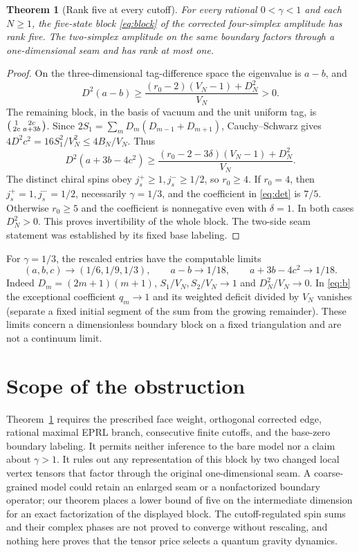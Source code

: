 \documentclass[11pt]{article}
\newtheorem{theorem}{Theorem}[section]
\theoremstyle{remark}
\begin{document}
\begin{theorem}[Rank five at every cutoff]\label{thm:rank}
For every rational \(0<\gamma<1\) and each \(N\ge1\), the five-state block \eqref{eq:block} of the corrected four-simplex amplitude has rank five. The two-simplex amplitude on the same boundary factors through a one-dimensional seam and has rank at most one.
\end{theorem}
\begin{proof}
On the three-dimensional tag-difference space the eigenvalue is \(a-b\), and
\[
 D^2(a-b)\ge
 \frac{(r_0-2)(V_N-1)+D_N^2}{V_N}>0.
\]
The remaining block, in the basis of vacuum and the unit uniform tag, is
\(\begin{psmallmatrix}1&2c\\2c&a+3b\end{psmallmatrix}\). Since
\(2S_1=\sum_mD_m(D_{m-1}+D_{m+1})\), Cauchy--Schwarz gives
\(4D^2c^2=16S_1^2/V_N^2\le4B_N/V_N\). Thus
\begin{equation}\label{eq:det}
 D^2(a+3b-4c^2)\ge
 \frac{(r_0-2-3\delta)(V_N-1)+D_N^2}{V_N}.
\end{equation}
The distinct chiral spins obey \(j_s^+\ge1,j_s^-\ge1/2\), so \(r_0\ge4\). If \(r_0=4\), then \(j_s^+=1,j_s^-=1/2\), necessarily \(\gamma=1/3\), and the coefficient in \eqref{eq:det} is \(7/5\). Otherwise \(r_0\ge5\) and the coefficient is nonnegative even with \(\delta=1\). In both cases \(D_N^2>0\). This proves invertibility of the whole block. The two-side seam statement was established by its fixed base labeling.
\end{proof}

For \(\gamma=1/3\), the rescaled entries have the computable limits
\[
 (a,b,c)\longrightarrow (1/6,1/9,1/3),\qquad
 a-b\longrightarrow1/18,\qquad a+3b-4c^2\longrightarrow1/18.
\]
Indeed \(D_m=(2m+1)(m+1)\), \(S_1/V_N,S_2/V_N\to1\) and \(D_N^2/V_N\to0\). In \eqref{eq:b} the exceptional coefficient \(q_m\to1\) and its weighted deficit divided by \(V_N\) vanishes (separate a fixed initial segment of the sum from the growing remainder). These limits concern a dimensionless boundary block on a fixed triangulation and are not a continuum limit.

\section{Scope of the obstruction}

Theorem~\ref{thm:rank} requires the prescribed face weight, orthogonal corrected edge, rational maximal EPRL branch, consecutive finite cutoffs, and the base-zero boundary labeling. It permits neither inference to the bare model nor a claim about \(\gamma>1\). It rules out any representation of this block by two changed local vertex tensors that factor through the original one-dimensional seam. A coarse-grained model could retain an enlarged seam or a nonfactorized boundary operator; our theorem places a lower bound of five on the intermediate dimension for an exact factorization of the displayed block. The cutoff-regulated spin sums and their complex phases are not proved to converge without rescaling, and nothing here proves that the tensor price selects a quantum gravity dynamics.
\end{document}
